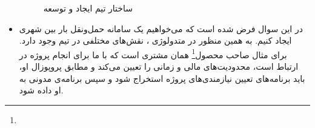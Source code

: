\begin{itemize}
\begin{figure}[!h]
\begin{center}
			\caption{ساختار تیم ایجاد و توسعه}
		\end{center}
	\end{figure}
	\item 
	در این سوال فرض شده است که می‌خواهیم یک سامانه حمل‌ونقل بار بین شهری ایجاد کنیم. به همین منظور در متدولوژی ، نقش‌های مختلفی در تیم وجود دارد. برای مثال صاحب محصول\footnote{} همان مشتری است که با ما برای انجام پروژه در ارتباط است، محدودیت‌های مالی و زمانی را تعیین می‌کند و مطابق پروپوزال او، باید برنامه‌های تعیین نیازمندی‌های پروژه استخراج شود و سپس برنامه‌ی مدونی به او داده شود.
	
\end{itemize}